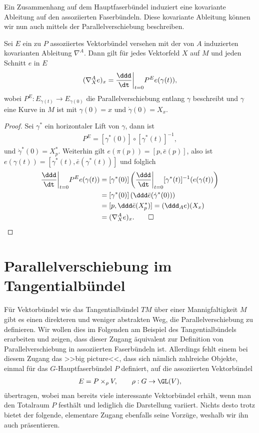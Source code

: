\documentclass[%
	paper=a5,%
	fleqn,%
	DIV=18,%
	BCOR=0mm,
	fontsize=11pt,
	titlepage=false,%
	bibliography=totoc,
	DIV=18,%
	twoside=true,
	pdftitle=Riemannsche Geometrie,
	pdfauthor=Uwe Semmelmann,
	numbers=noendperiod]%
	{scrbook}
\begin{document}
Ein Zusammenhang auf dem Hauptfaserbündel induziert eine kovariante Ableitung
auf den assoziierten Faserbündeln. Diese kovariante Ableitung können wir nun
auch mittels der Parallelverschiebung beschreiben.

\begin{prop}
Sei $E$ ein zu $P$ assoziiertes Vektorbündel versehen mit der von $A$ induzierten kovarianten Ableitung $\nabla^A$. 
Dann gilt für jedes
Vektorfeld $X$ auf $M$ und jeden Schnitt $e$ in $E$ 
\begin{align*}
(\nabla_X^A e)_x = \frac{\ddd}{\dt}\bigg|_{t=0} P^E e(\gamma(t)),
\end{align*}
wobei $P^E: E_{\gamma(t)}\to E_{\gamma(0)}$ die Parallelverschiebung entlang
$\gamma$ beschreibt und $\gamma$ eine Kurve in $M$ ist mit $\gamma(0) = x$ und
$\dot{\gamma}(0) = X_x$.\fish
\end{prop}

\begin{proof}
Sei $\gamma^*$ ein horizontaler Lift von $\gamma$, dann ist
\begin{align*}
P^E = [\gamma^*(0)]\circ [\gamma^*(t)]^{-1},
\end{align*}
und $\dot{\gamma}^*(0) = X_p^*$. Weiterhin gilt $e(\pi(p)) = [p,\bar{e}(p)]$,
also ist $e(\gamma(t)) = [\gamma^*(t),\bar{e}(\gamma^*(t))]$ und folglich
\begin{align*}
\frac{\ddd}{\dt}\bigg|_{t=0} P^E e(\gamma(t)) &= 
[\gamma^*(0)] \left(\frac{\ddd}{\dt}\bigg|_{t=0}
[\gamma^*(t)]^{-1}(e(\gamma(t)) \right)\\
&= [\gamma^*(0)] \left(
\ddd\bar{e}(\dot{\gamma}^*(0)) \right)\\
&= [p,\ddd \bar{e}(X_p^*)]
= (\ddd_A e)(X_x) \\
&= (\nabla^A_X e)_x.\qed
\end{align*}
\end{proof}


\section{Parallelverschiebung im Tangentialbündel}

Für Vektorbündel wie das Tangentialbündel $TM$ über einer Mannigfaltigkeit $M$
gibt es einen direkteren und weniger abstrakten Weg, die Parallelverschiebung zu
definieren. Wir wollen dies im Folgenden am Beispiel des Tangentialbündels
erarbeiten und zeigen, dass dieser Zugang äquivalent zur Definition von
Parallelverschiebung in assoziierten Faserbündeln ist. Allerdings fehlt einem
bei diesem Zugang das >>big picture<<, dass sich nämlich zahlreiche 
Objekte, einmal für das $G$-Hauptfaserbündel $P$ definiert, auf die assoziierten
Vektorbündel
\begin{align*}
E = P\times_\rho V,\qquad \rho : G\to \GL(V),
\end{align*}
übertragen, wobei man bereits viele interessante Vektorbündel erhält, wenn man
den Totalraum $P$  festhält und lediglich die Darstellung
variiert.
Nichts desto trotz bietet  der folgende, elementare Zugang ebenfalls seine
Vorzüge, weshalb wir ihn auch präsentieren. 
\end{document}

